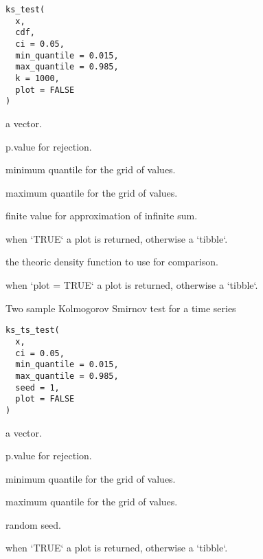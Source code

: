 \documentclass[a4paper]{book}
\begin{document}
%
\begin{Usage}
\begin{verbatim}
ks_test(
  x,
  cdf,
  ci = 0.05,
  min_quantile = 0.015,
  max_quantile = 0.985,
  k = 1000,
  plot = FALSE
)
\end{verbatim}
\end{Usage}
%
\begin{Arguments}
\begin{ldescription}
\item[\code{x}] a vector.

\item[\code{ci}] p.value for rejection.

\item[\code{min\_quantile}] minimum quantile for the grid of values.

\item[\code{max\_quantile}] maximum quantile for the grid of values.

\item[\code{k}] finite value for approximation of infinite sum.

\item[\code{plot}] when `TRUE` a plot is returned, otherwise a `tibble`.

\item[\code{pdf}] the theoric density function to use for comparison.
\end{ldescription}
\end{Arguments}
%
\begin{Value}
when `plot = TRUE` a plot is returned, otherwise a `tibble`.
\end{Value}
%
\begin{Description}\relax
Two sample Kolmogorov Smirnov test for a time series
\end{Description}
%
\begin{Usage}
\begin{verbatim}
ks_ts_test(
  x,
  ci = 0.05,
  min_quantile = 0.015,
  max_quantile = 0.985,
  seed = 1,
  plot = FALSE
)
\end{verbatim}
\end{Usage}
%
\begin{Arguments}
\begin{ldescription}
\item[\code{x}] a vector.

\item[\code{ci}] p.value for rejection.

\item[\code{min\_quantile}] minimum quantile for the grid of values.

\item[\code{max\_quantile}] maximum quantile for the grid of values.

\item[\code{seed}] random seed.

\item[\code{plot}] when `TRUE` a plot is returned, otherwise a `tibble`.
\end{ldescription}
\end{Arguments}
\end{document}
